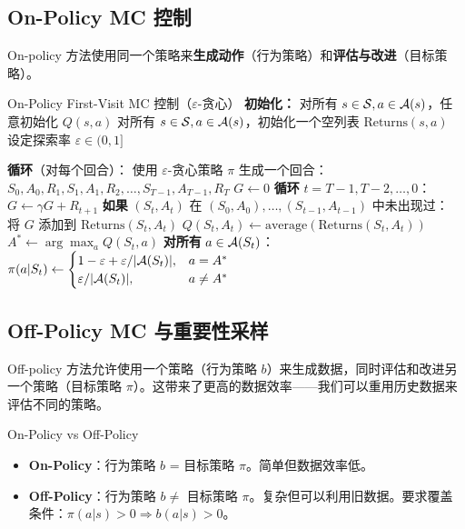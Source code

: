 \subsection{On-Policy MC 控制}

On-policy 方法使用同一个策略来\textbf{生成动作}（行为策略）和\textbf{评估与改进}（目标策略）。

\begin{myalgorithm}{On-Policy First-Visit MC 控制（$\varepsilon$-贪心）}
\textbf{初始化：}
\quad 对所有 $s \in \mathcal{S}, a \in \mathcal{A}(s)$，任意初始化 $Q(s,a)$
\quad 对所有 $s \in \mathcal{S}, a \in \mathcal{A}(s)$，初始化一个空列表 $\text{Returns}(s,a)$
\quad 设定探索率 $\varepsilon \in (0,1]$

\textbf{循环}（对每个回合）：
\quad 使用 $\varepsilon$-贪心策略 $\pi$ 生成一个回合：
\quad \quad $S_0, A_0, R_1, S_1, A_1, R_2, \ldots, S_{T-1}, A_{T-1}, R_T$
\quad $G \leftarrow 0$
\quad \textbf{循环} $t = T-1, T-2, \ldots, 0$：
\quad \quad $G \leftarrow \gamma G + R_{t+1}$
\quad \quad \textbf{如果} $(S_t, A_t)$ 在 $(S_0, A_0), \ldots, (S_{t-1}, A_{t-1})$ 中未出现过：
\quad \quad \quad 将 $G$ 添加到 $\text{Returns}(S_t, A_t)$
\quad \quad \quad $Q(S_t, A_t) \leftarrow \text{average}(\text{Returns}(S_t, A_t))$
\quad \quad \quad $A^* \leftarrow \arg\max_a Q(S_t, a)$
\quad \quad \quad \textbf{对所有} $a \in \mathcal{A}(S_t)$：
\quad \quad \quad \quad $\pi(a|S_t) \leftarrow \begin{cases}
1-\varepsilon+\varepsilon/|\mathcal{A}(S_t)|, & a = A^*\\
\varepsilon/|\mathcal{A}(S_t)|, & a \neq A^*
\end{cases}$
\end{myalgorithm}

\subsection{Off-Policy MC 与重要性采样}

Off-policy 方法允许使用一个策略（行为策略 $b$）来生成数据，同时评估和改进另一个策略（目标策略 $\pi$）。这带来了更高的数据效率——我们可以重用历史数据来评估不同的策略。

\begin{mydefinition}{On-Policy vs Off-Policy}
\begin{itemize}
    \item \textbf{On-Policy}：行为策略 $b$ = 目标策略 $\pi$。简单但数据效率低。
    \item \textbf{Off-Policy}：行为策略 $b \neq$ 目标策略 $\pi$。复杂但可以利用旧数据。要求覆盖条件：$\pi(a|s) > 0 \Rightarrow b(a|s) > 0$。
\end{itemize}
\end{mydefinition}

